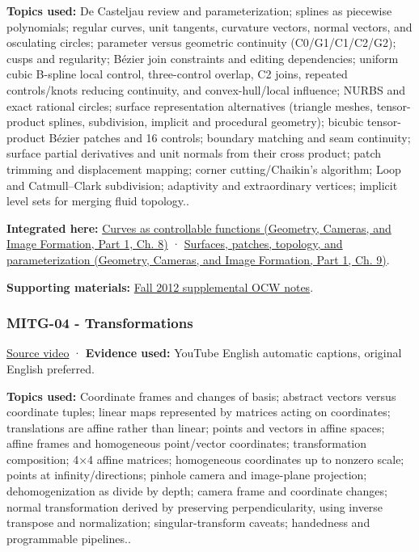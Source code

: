 \textbf{Topics used:} De Casteljau review and parameterization; splines as piecewise polynomials; regular curves, unit tangents, curvature vectors, normal vectors, and osculating circles; parameter versus geometric continuity (C0/G1/C1/C2/G2); cusps and regularity; Bézier join constraints and editing dependencies; uniform cubic B-spline local control, three-control overlap, C2 joins, repeated controls/knots reducing continuity, and convex-hull/local influence; NURBS and exact rational circles; surface representation alternatives (triangle meshes, tensor-product splines, subdivision, implicit and procedural geometry); bicubic tensor-product Bézier patches and 16 controls; boundary matching and seam continuity; surface partial derivatives and unit normals from their cross product; patch trimming and displacement mapping; corner cutting/Chaikin's algorithm; Loop and Catmull--Clark subdivision; adaptivity and extraordinary vertices; implicit level sets for merging fluid topology..

\textbf{Integrated here:} \href{../03-Geometry-Cameras-and-Image-Formation-P01/main.pdf\#nameddest=03-visual-computing-i-ch001-curves-as-controllable-functions}{Curves as controllable functions (Geometry, Cameras, and Image Formation, Part 1, Ch. 8)} · \href{../03-Geometry-Cameras-and-Image-Formation-P01/main.pdf\#nameddest=03-visual-computing-i-ch002-surfaces-patches-topology-and-parameterization}{Surfaces, patches, topology, and parameterization (Geometry, Cameras, and Image Formation, Part 1, Ch. 9)}.

\textbf{Supporting materials:} \href{https://ocw.mit.edu/courses/6-837-computer-graphics-fall-2012/pages/lecture-notes/}{Fall 2012 supplemental OCW notes}.

\subsubsection{MITG-04 - Transformations}\label{04-visual-computing-ii-ch036-mitg-04---transformations}

\hypertarget{04-visual-computing-ii-ch036-mitg-04---transformations}{}

\href{https://www.youtube.com/watch?v=WqmL_e7OGeU}{Source video} · \textbf{Evidence used:} YouTube English automatic captions, original English preferred.

\textbf{Topics used:} Coordinate frames and changes of basis; abstract vectors versus coordinate tuples; linear maps represented by matrices acting on coordinates; translations are affine rather than linear; points and vectors in affine spaces; affine frames and homogeneous point/vector coordinates; transformation composition; 4×4 affine matrices; homogeneous coordinates up to nonzero scale; points at infinity/directions; pinhole camera and image-plane projection; dehomogenization as divide by depth; camera frame and coordinate changes; normal transformation derived by preserving perpendicularity, using inverse transpose and normalization; singular-transform caveats; handedness and programmable pipelines..


